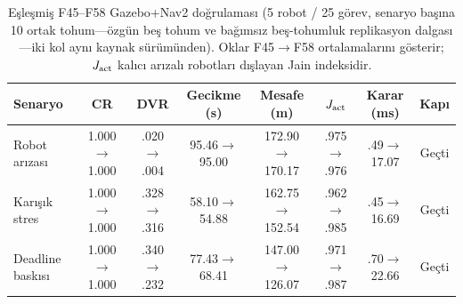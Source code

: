 \begin{table}[t]
\centering
\caption{Eşleşmiş F45--F58 Gazebo+Nav2 doğrulaması
(5 robot / 25 görev, senaryo başına 10 ortak tohum---özgün beş tohum ve
bağımsız beş-tohumluk replikasyon dalgası---iki kol aynı kaynak
sürümünden). Oklar F45$\rightarrow$F58 ortalamalarını gösterir; $J_{\rm act}$
kalıcı arızalı robotları dışlayan Jain indeksidir.}
\label{tab:f58-gazebo}
\small
\setlength{\tabcolsep}{3.8pt}
\begin{tabular}{lccccccc}
\toprule
Senaryo & CR & DVR & Gecikme (s) & Mesafe (m) & $J_{\rm act}$ & Karar (ms) & Kapı \\
\midrule
Robot arızası
  & 1.000$\to$1.000 & .020$\to$.004 & 95.46$\to$95.00
  & 172.90$\to$170.17 & .975$\to$.976 & .49$\to$17.07 & Geçti \\
Karışık stres
  & 1.000$\to$1.000 & .328$\to$.316 & 58.10$\to$54.88
  & 162.75$\to$152.54 & .962$\to$.985 & .45$\to$16.69 & Geçti \\
Deadline baskısı
  & 1.000$\to$1.000 & .340$\to$.232 & 77.43$\to$68.41
  & 147.00$\to$126.07 & .971$\to$.987 & .70$\to$22.66 & Geçti \\
\bottomrule
\end{tabular}
\end{table}
